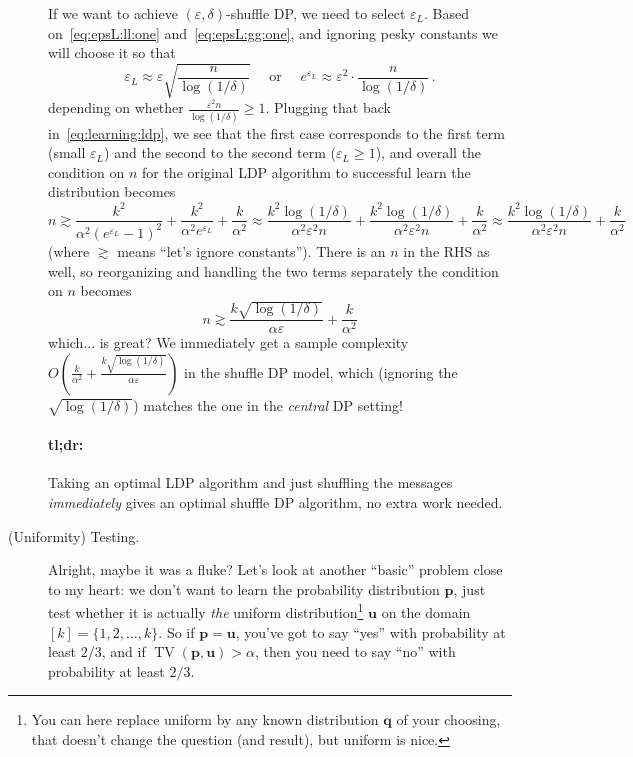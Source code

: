 \documentclass[11pt]{article}
\begin{document}
\begin{description}
If we want to achieve $(\varepsilon,\delta)$-shuffle DP, we need to select $\varepsilon_L$. Based on~\eqref{eq:epsL:ll:one} and~\eqref{eq:epsL:gg:one}, and ignoring pesky constants we will choose it so that
\begin{equation}
	\label{eq:choice:epsL}
	 \varepsilon_{L} \approx \varepsilon \sqrt{\frac{n}{\log(1/\delta)}}  \quad\text{ or }\quad e^{\varepsilon_{L}} \approx \varepsilon^2 \cdot \frac{n}{\log(1/\delta)}\,.
\end{equation}
depending on whether $\frac{\varepsilon^2 n}{\log(1/\delta)}\geq 1$. Plugging that back in~\eqref{eq:learning:ldp}, we see that the first case corresponds to the first term (small $\varepsilon_{L}$) and the second to the second term ($\varepsilon_{L} \geq 1$), and overall the condition on $n$ for the original LDP algorithm to 
successful learn the distribution becomes
\[
	n \gtrsim 
	\frac{k^2}{\alpha^2(e^{\varepsilon_{L}}-1)^2}+\frac{k^2}{\alpha^2e^{\varepsilon_{L}}}+\frac{k}{\alpha^2}
	\approx \frac{k^2\log(1/\delta)}{\alpha^2\varepsilon^2 n}+\frac{k^2\log(1/\delta)}{\alpha^2\varepsilon^2 n}+\frac{k}{\alpha^2}
	 \approx \frac{k^2\log(1/\delta)}{\alpha^2\varepsilon^2 n}+\frac{k}{\alpha^2}
\]
(where $\gtrsim$ means ``let's ignore constants''). There is an $n$ in the RHS as well, so reorganizing and handling the two terms separately the condition on $n$ becomes
\[
	n \gtrsim \frac{k \sqrt{\log(1/\delta)}}{\alpha\varepsilon}+\frac{k}{\alpha^2}
\]
which... is great? We immediately get a sample complexity $O\!\left(\frac{k}{\alpha^2}+\frac{k \sqrt{\log(1/\delta)}}{\alpha\varepsilon}\right)$ in the shuffle DP model, which (ignoring the $\sqrt{\log(1/\delta)}$) matches the one in the \emph{central} DP setting! 

\paragraph{tl;dr:} Taking an optimal LDP algorithm and just shuffling the messages \emph{immediately} gives an optimal shuffle DP algorithm, no extra work needed.
\item[(Uniformity) Testing.] Alright, maybe it was a fluke? Let's look at another ``basic'' problem close to my heart: we don't want to learn the probability distribution $\mathbf{p}$, just test whether it is actually \emph{the} uniform distribution\footnote{You can here replace uniform by any known distribution $\mathbf{q}$ of your choosing, that doesn't change the question (and result), but uniform is nice.} $\mathbf{u}$ on the domain $[k]=\{1,2,\dots,k\}$. So if $\mathbf{p} =\mathbf{u}$, you've got to say ``yes'' with probability at least $2/3$, and if $\operatorname{TV}(\mathbf{p},\mathbf{u})>\alpha$, then you need to say ``no'' with probability at least $2/3$.


\end{description}
\end{document}
